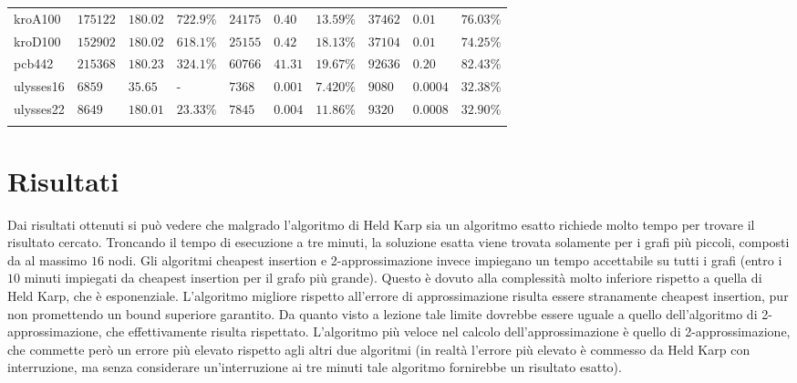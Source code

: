 \begin{tabularx}{\textwidth}{*{10}{Y}}
    kroA100 & $175122$ & $180.02$ & $722.9$\% & $24175$ & $0.40$ & $13.59$\% & $37462$ & $0.01$ & $76.03$\%\\
    kroD100 & $152902$ & $180.02$ & $618.1$\% & $25155$ & $0.42$ & $18.13$\% & $37104$ & $0.01$ & $74.25$\%\\
    pcb442 & $215368$ & $180.23$ & $324.1$\% & $60766$ & $41.31$ & $19.67$\% & $92636$ & $0.20$ & $82.43$\%\\
    ulysses16 & $6859$ & $35.65$ & - & $7368$ & $0.001$ & $7.420$\% & $9080$ & $0.0004$ & $32.38$\%\\
    ulysses22 & $8649$ & $180.01$ & $23.33$\% & $7845$ & $0.004$ & $11.86$\% & $9320$ & $0.0008$ & $32.90$\%\\
    \bottomrule
    \caption{Risultati}\label{tab:risultati}
\end{tabularx}

\normalsize

\clearpage

\section{Risultati\label{sec:risultati}}
Dai risultati ottenuti si può vedere che malgrado l'algoritmo di Held Karp sia un algoritmo esatto richiede molto tempo per trovare il risultato cercato. Troncando il tempo di esecuzione a tre minuti, la soluzione esatta viene trovata solamente per i grafi più piccoli, composti da al massimo $16$ nodi.
Gli algoritmi cheapest insertion e 2-approssimazione invece impiegano un tempo accettabile su tutti i grafi (entro i $10$ minuti impiegati da cheapest insertion per il grafo più grande). Questo è dovuto alla complessità molto inferiore rispetto a quella di Held Karp, che è esponenziale.
L'algoritmo migliore rispetto all'errore di approssimazione risulta essere stranamente cheapest insertion, pur non promettendo un bound superiore garantito.
Da quanto visto a lezione tale limite dovrebbe essere uguale a quello dell'algoritmo di 2-approssimazione, che effettivamente risulta rispettato.
L'algoritmo più veloce nel calcolo dell'approssimazione è quello di 2-approssimazione, che commette però un errore più elevato rispetto agli altri due algoritmi (in realtà l'errore più elevato è commesso da Held Karp con interruzione, ma senza considerare un'interruzione ai tre minuti tale algoritmo fornirebbe un risultato esatto).